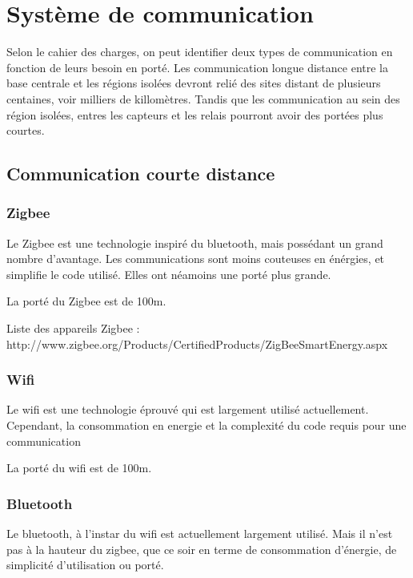 \section{Système de communication}

Selon le cahier des charges, on peut identifier deux types de communication en fonction de leurs besoin en porté.
Les communication longue distance entre la base centrale et les régions isolées devront relié des sites distant de plusieurs centaines, voir milliers de killomètres.
Tandis que les communication au sein des région isolées, entres les capteurs et les relais pourront avoir des portées plus courtes.



    \subsection{Communication courte distance}


        \subsubsection{Zigbee}
            Le Zigbee est une technologie inspiré du bluetooth, mais possédant un grand nombre d'avantage.
            Les communications sont moins couteuses en énérgies, et simplifie le code utilisé.
            Elles ont néamoins une porté plus grande.
            
            La porté du Zigbee est de 100m.

            Liste des appareils Zigbee :
            http://www.zigbee.org/Products/CertifiedProducts/ZigBeeSmartEnergy.aspx

        \subsubsection{Wifi}
            Le wifi est une technologie éprouvé qui est largement utilisé actuellement.
            Cependant, la consommation en energie et la complexité du code requis pour une communication 
            
            La porté du wifi est de 100m.

        \subsubsection{Bluetooth}
            Le bluetooth, à l'instar du wifi est actuellement largement utilisé.
            Mais il n'est pas à la hauteur du zigbee, que ce soir en terme de consommation d'énergie, de simplicité d'utilisation ou porté.
            
